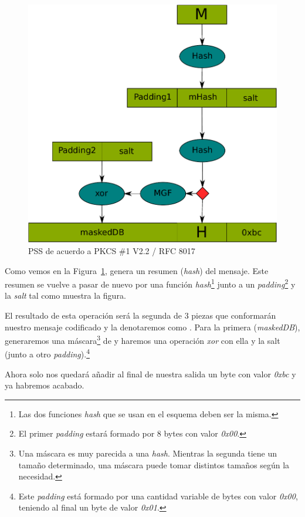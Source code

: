  \begin{figure}[ht]
   \centering
   \includegraphics[scale=0.6]{Figures/PSS}
   \decoRule
   \caption[PSS (Esquema)]{PSS de acuerdo a PKCS \#1 V2.2 / RFC 8017}
   \label{fig:PSS}
 \end{figure}

 Como vemos en la Figura~\ref{fig:PSS},  genera un resumen (\emph{hash}) del mensaje.
 Este resumen se vuelve a pasar de nuevo por una función \emph{hash}\footnote{Las dos funciones \emph{hash} que se usan en el esquema deben ser la misma.} junto a un \emph{padding}\footnote{El primer \emph{padding} estará formado por 8 bytes con valor \emph{0x00}.} y la \emph{salt} tal como muestra la figura.

 El resultado de esta operación será la segunda de 3 piezas que conformarán nuestro mensaje codificado y la denotaremos como .
 Para la primera (\emph{maskedDB}), generaremos una máscara\footnote{Una máscara es muy parecida a una \emph{hash}. Mientras la segunda tiene un tamaño determinado, una máscara puede tomar distintos tamaños según la necesidad.} de  y haremos una operación \emph{xor} con ella y la salt (junto a otro \emph{padding}).\footnote{Este \emph{padding} está formado por una cantidad variable de bytes con valor \emph{0x00}, teniendo al final un byte de valor \emph{0x01}.}

 Ahora solo nos quedará añadir al final de nuestra salida un byte con valor \emph{0xbc} y ya habremos acabado. \emph{\parencite{Reference17}}


